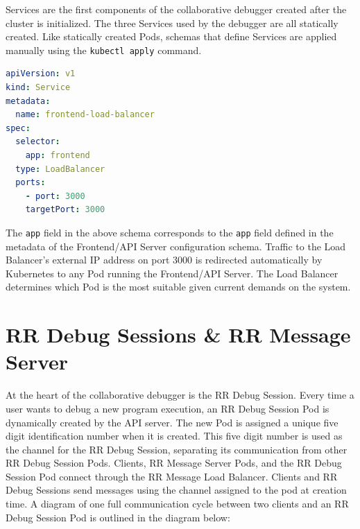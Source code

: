 \documentclass[12pt]{article}
\begin{document}
Services are the first components of the collaborative debugger
created after the cluster is initialized.  The three Services used by
the debugger are all statically created.  Like statically created
Pods, schemas that define Services are applied manually using the
\lstinline{kubectl apply} command.

\begin{lstlisting}[language=YAML,basicstyle=\linespread{0.5}\ttfamily,caption={Frontend Load Balancer Schema},captionpos=b]
apiVersion: v1
kind: Service
metadata:
  name: frontend-load-balancer
spec:
  selector:
    app: frontend
  type: LoadBalancer
  ports:
    - port: 3000
    targetPort: 3000
\end{lstlisting}

The \lstinline{app} field in the above schema corresponds to the
\lstinline{app} field defined in the metadata of the Frontend/API
Server configuration schema.  Traffic to the Load Balancer's external
IP address on port 3000 is redirected automatically by Kubernetes to
any Pod running the Frontend/API Server.  The Load Balancer determines
which Pod is the most suitable given current demands on the system.

\section{RR Debug Sessions \& RR Message Server}

At the heart of the collaborative debugger is the RR Debug Session.
Every time a user wants to debug a new program execution, an RR Debug
Session Pod is dynamically created by the API server.  The new Pod is
assigned a unique five digit identification number when it is created.
This five digit number is used as the channel for the RR Debug
Session, separating its communication from other RR Debug Session
Pods.  Clients, RR Message Server Pods, and the RR Debug Session Pod
connect through the RR Message Load Balancer.  Clients and RR Debug
Sessions send messages using the channel assigned to the pod at
creation time.  A diagram of one full communication cycle between two
clients and an RR Debug Session Pod is outlined in the diagram below:
\end{document}
